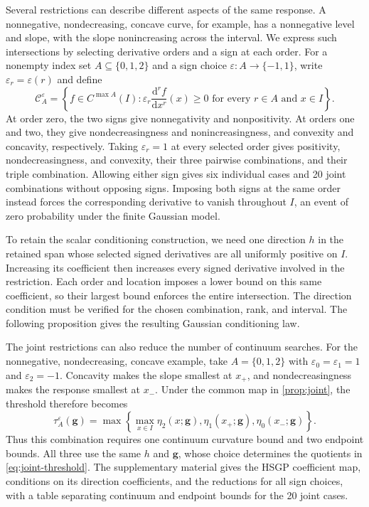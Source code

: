 Several restrictions can describe different aspects of the same
response. A nonnegative, nondecreasing, concave curve, for example,
has a nonnegative level and slope, with the slope nonincreasing across
the interval. We express such intersections by selecting derivative
orders and a sign at each order. For a nonempty index set
$A\subseteq\{0,1,2\}$ and a sign choice
$\varepsilon:A\to\{-1,1\}$, write $\varepsilon_r=\varepsilon(r)$ and define
\begin{equation}\label{eq:joint-event}
 \mathcal C_A^\varepsilon=\left\{f\in C^{\max A}(I):
       \varepsilon_r\frac{\mathrm{d}^rf}{\mathrm{d}x^r}(x)\geq0
       \text{ for every }r\in A\text{ and }x\in I\right\}.
\end{equation}
At order zero, the two signs give nonnegativity and nonpositivity.
At orders one and two, they give nondecreasingness and nonincreasingness,
and convexity and concavity, respectively. Taking $\varepsilon_r=1$
at every selected order gives positivity, nondecreasingness, and
convexity, their three pairwise combinations, and their triple
combination. Allowing either sign gives six individual cases and
20 joint combinations without opposing signs. Imposing both signs
at the same order instead forces the corresponding derivative to
vanish throughout $I$, an event of zero probability under the finite
Gaussian model.

To retain the scalar conditioning construction, we need one direction
$h$ in the retained span whose selected signed derivatives are all
uniformly positive on $I$. Increasing its coefficient then increases
every signed derivative involved in the restriction. Each order and
location imposes a lower bound on this same coefficient, so their
largest bound enforces the entire intersection. The direction
condition must be verified for the chosen combination, rank, and
interval. The following proposition gives the resulting Gaussian
conditioning law.



The joint restrictions can also reduce the number of continuum
searches. For the nonnegative, nondecreasing, concave example, take
$A=\{0,1,2\}$ with $\varepsilon_0=\varepsilon_1=1$ and
$\varepsilon_2=-1$. Concavity makes the slope smallest at $x_+$,
and nondecreasingness makes the response smallest at $x_-$.
Under the common map in \cref{prop:joint}, the threshold therefore becomes
\[
 \tau_A^\varepsilon(\boldsymbol g)
 =\max\left\{
       \max_{x\in I}\eta_2(x;\boldsymbol g),
       \eta_1(x_+;\boldsymbol g),\eta_0(x_-;\boldsymbol g)
       \right\}.
\]
Thus this combination requires one continuum curvature bound and
two endpoint bounds. All three use the same $h$ and $\boldsymbol g$,
whose choice determines the quotients in \cref{eq:joint-threshold}.
The supplementary material gives the HSGP coefficient map, conditions
on its direction coefficients, and the reductions for all sign choices,
with a table separating continuum and endpoint bounds for the 20
joint cases.

